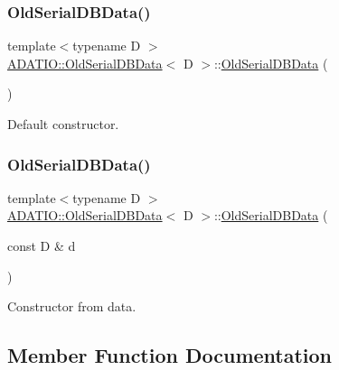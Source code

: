 \subsubsection{\texorpdfstring{OldSerialDBData()}{OldSerialDBData()}\hspace{0.1cm}{\footnotesize\ttfamily [3/4]}}
{\footnotesize\ttfamily template$<$typename D $>$ \\
\mbox{\hyperlink{classADATIO_1_1OldSerialDBData}{A\+D\+A\+T\+I\+O\+::\+Old\+Serial\+D\+B\+Data}}$<$ D $>$\+::\mbox{\hyperlink{classADATIO_1_1OldSerialDBData}{Old\+Serial\+D\+B\+Data}} (\begin{DoxyParamCaption}{ }\end{DoxyParamCaption})\hspace{0.3cm}{\ttfamily [inline]}}



Default constructor. 

\mbox{\label{classADATIO_1_1OldSerialDBData_ada293b92b5081fbb6e82364196ff5524}} 
\subsubsection{\texorpdfstring{OldSerialDBData()}{OldSerialDBData()}\hspace{0.1cm}{\footnotesize\ttfamily [4/4]}}
{\footnotesize\ttfamily template$<$typename D $>$ \\
\mbox{\hyperlink{classADATIO_1_1OldSerialDBData}{A\+D\+A\+T\+I\+O\+::\+Old\+Serial\+D\+B\+Data}}$<$ D $>$\+::\mbox{\hyperlink{classADATIO_1_1OldSerialDBData}{Old\+Serial\+D\+B\+Data}} (\begin{DoxyParamCaption}\item[{const D \&}]{d }\end{DoxyParamCaption})\hspace{0.3cm}{\ttfamily [inline]}}



Constructor from data. 



\subsection{Member Function Documentation}
\mbox{\label{classADATIO_1_1OldSerialDBData_ad917fd5898616290b7c0d30cb878850f}} 
